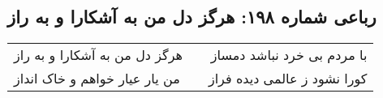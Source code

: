 \begin{center}
\section*{رباعی شماره ۱۹۸: هرگز دل من به آشکارا و به راز}
\label{sec:sh198}
\begin{longtable}{l p{0.5cm} r}
هرگز دل من به آشکارا و به راز
&&
با مردم بی خرد نباشد دمساز
\\
من یار عیار خواهم و خاک انداز
&&
کورا نشود ز عالمی دیده فراز
\\
\end{longtable}
\end{center}
